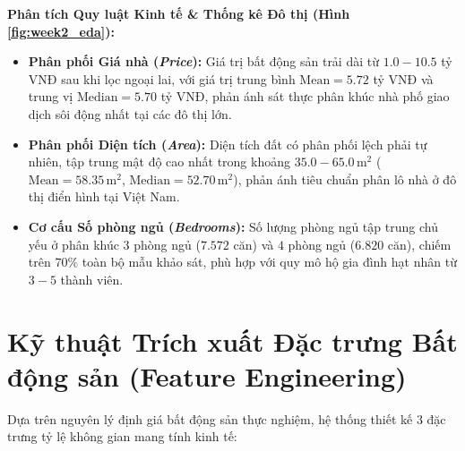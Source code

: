 \documentclass[12pt,a4paper]{report}
\begin{document}
\textbf{Phân tích Quy luật Kinh tế \& Thống kê Đô thị (Hình \ref{fig:week2_eda}):}
\begin{itemize}[leftmargin=1.5em]
    \item \textbf{Phân phối Giá nhà (\textit{Price}):} Giá trị bất động sản trải dài từ $1.0 - 10.5$ tỷ VNĐ sau khi lọc ngoại lai, với giá trị trung bình $\text{Mean} = 5.72$ tỷ VNĐ và trung vị $\text{Median} = 5.70$ tỷ VNĐ, phản ánh sát thực phân khúc nhà phố giao dịch sôi động nhất tại các đô thị lớn.
    \item \textbf{Phân phối Diện tích (\textit{Area}):} Diện tích đất có phân phối lệch phải tự nhiên, tập trung mật độ cao nhất trong khoảng $35.0 - 65.0\,\text{m}^2$ ($\text{Mean} = 58.35\,\text{m}^2$, $\text{Median} = 52.70\,\text{m}^2$), phản ánh tiêu chuẩn phân lô nhà ở đô thị điển hình tại Việt Nam.
    \item \textbf{Cơ cấu Số phòng ngủ (\textit{Bedrooms}):} Số lượng phòng ngủ tập trung chủ yếu ở phân khúc $3$ phòng ngủ ($7.572$ căn) và $4$ phòng ngủ ($6.820$ căn), chiếm trên $70\%$ toàn bộ mẫu khảo sát, phù hợp với quy mô hộ gia đình hạt nhân từ $3 - 5$ thành viên.
\end{itemize}

\section{Kỹ thuật Trích xuất Đặc trưng Bất động sản (Feature Engineering)}

Dựa trên nguyên lý định giá bất động sản thực nghiệm, hệ thống thiết kế 3 đặc trưng tỷ lệ không gian mang tính kinh tế:
\end{document}
